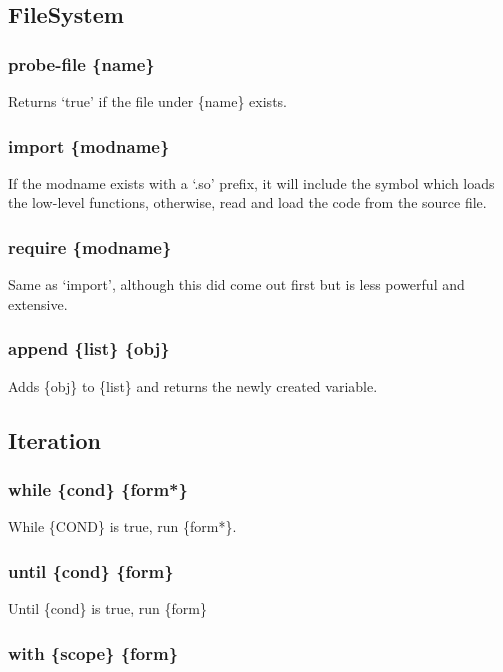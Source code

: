 \documentclass{article}
\begin{document}
	\subsection{FileSystem}
	
	\subsubsection{probe-file \{name\}}
	
	Returns `true' if the file under \{name\} exists.
	
	\subsubsection{import \{modname\}}
	
	If the modname exists with a `.so' prefix, it will include the symbol which loads the low-level functions, otherwise, read and load the code from the source file.
	
	\subsubsection{require \{modname\}}
	
	Same as `import', although this did come out first but is less powerful and extensive.
	
	\subsubsection{append \{list\} \{obj\}}
	
	Adds \{obj\} to \{list\} and returns the newly created variable.
	
	\subsection{Iteration}
	
	\subsubsection{while \{cond\} \{form*\}}
	
	While \{COND\} is true, run \{form*\}.
	
	\subsubsection{until \{cond\} \{form\}}
	
	Until \{cond\} is true, run \{form\}
	
	\subsubsection{with \{scope\} \{form\}}
	
\end{document}

